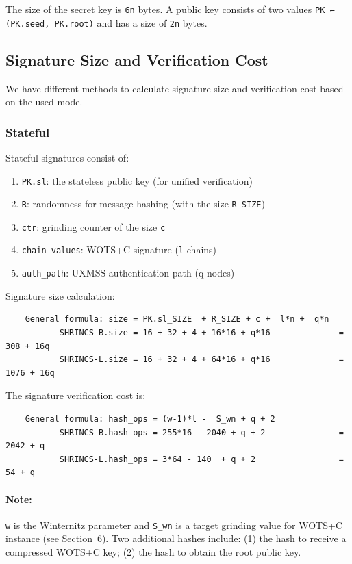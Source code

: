 The size of the secret key is \texttt{6n} bytes. A public key consists of two values \texttt{PK ← (PK.seed, PK.root)} and has a size of \texttt{2n} bytes.

\subsection{Signature Size and Verification Cost}
We have different methods to calculate signature size and verification cost based on the used mode. 
\subsubsection{Stateful}
Stateful signatures consist of:
\begin{enumerate}
    \item \texttt{PK.sl}: the stateless public key (for unified verification)
    \item \texttt{R}: randomness for message hashing (with the size \texttt{R\_SIZE})
    \item \texttt{ctr}: grinding counter of the size \texttt{c}
    \item \texttt{chain\_values}: WOTS+C signature (\texttt{l} chains)
    \item \texttt{auth\_path}: UXMSS authentication path (q nodes)
\end{enumerate}

Signature size calculation: 
\begin{verbatim}
    General formula: size = PK.sl_SIZE  + R_SIZE + c +  l*n +  q*n  
           SHRINCS-B.size = 16 + 32 + 4 + 16*16 + q*16              = 308 + 16q
           SHRINCS-L.size = 16 + 32 + 4 + 64*16 + q*16              = 1076 + 16q
\end{verbatim}

The signature verification cost is:
\begin{verbatim}
    General formula: hash_ops = (w-1)*l -  S_wn + q + 2  
           SHRINCS-B.hash_ops = 255*16 - 2040 + q + 2               = 2042 + q
           SHRINCS-L.hash_ops = 3*64 - 140  + q + 2                 = 54 + q
\end{verbatim}

\paragraph{Note:} \texttt{w} is the Winternitz parameter and \texttt{S\_wn} is a target grinding value for WOTS+C instance (see Section~6). Two additional hashes include: (1) the hash to receive a compressed WOTS+C key; (2) the hash to obtain the root public key.

